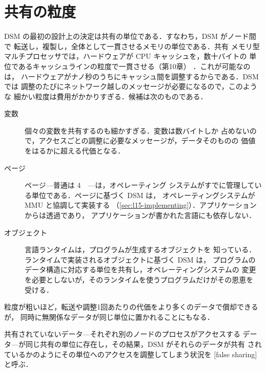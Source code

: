 \documentclass[../main.tex]{subfiles}
\begin{document}
\section{共有の粒度}
\label{sec:l15-granularity}

DSM の最初の設計上の決定は共有の単位である．すなわち，DSM がノード間で
転送し，複製し，全体として一貫させるメモリの単位である．共有
メモリ型マルチプロセッサでは，ハードウェアが CPU キャッシュを，数十バイトの
単位であるキャッシュラインの粒度で一貫させる（第10章）
．これが可能なのは，
ハードウェアがナノ秒のうちにキャッシュ間を調整するからである．DSM では
調整のたびにネットワーク越しのメッセージが必要になるので，このような
細かい粒度は費用がかかりすぎる．候補は次のものである．
\begin{description}
  \item[変数] 個々の変数を共有するのも細かすぎる．変数は数バイトしか
    占めないので，アクセスごとの調整に必要なメッセージが，データそのものの
    価値をはるかに超える代価となる．
  \item[ページ] ページ---普通は \SI{4}{\kibi\byte}---は，オペレーティング
    システムがすでに管理している単位である．ページに基づく DSM は，
    オペレーティングシステムが MMU と協調して実装する
    （\cref{sec:l15-implementing}）．アプリケーションからは透過であり，
    アプリケーションが書かれた言語にも依存しない．
  \item[オブジェクト] 言語ランタイムは，プログラムが生成するオブジェクトを
    知っている．ランタイムで実装されるオブジェクトに基づく DSM は，
    プログラムのデータ構造に対応する単位を共有し，オペレーティングシステムの
    変更を必要としないが，そのランタイムを使うプログラムだけがその恩恵を
    受ける．
\end{description}

粒度が粗いほど，転送や調整1回あたりの代価をより多くのデータで償却できるが，
同時に無関係なデータが同じ単位に置かれることにもなる．

\begin{definition}[偽共有]
  共有されていないデータ---それぞれ別のノードのプロセスがアクセスする
  データ---が同じ共有の単位に存在し，その結果，DSM がそれらのデータが共有
  されているかのようにその単位へのアクセスを調整してしまう状況を
  [false sharing]と呼ぶ．
\end{definition}
\end{document}
